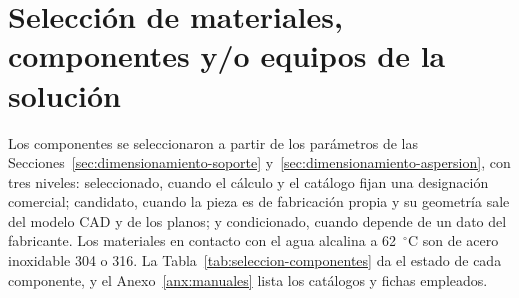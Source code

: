 \section{Selección de materiales, componentes y/o equipos de la solución}
\label{sec:seleccion-componentes}

Los componentes se seleccionaron a partir de los parámetros de las Secciones~\ref{sec:dimensionamiento-soporte} y~\ref{sec:dimensionamiento-aspersion}, con tres niveles: seleccionado, cuando el cálculo y el catálogo fijan una designación comercial; candidato, cuando la pieza es de fabricación propia y su geometría sale del modelo CAD y de los planos; y condicionado, cuando depende de un dato del fabricante. Los materiales en contacto con el agua alcalina a 62~$^\circ$C son de acero inoxidable 304 o 316. La Tabla~\ref{tab:seleccion-componentes} da el estado de cada componente, y el Anexo~\ref{anx:manuales} lista los catálogos y fichas empleados.

